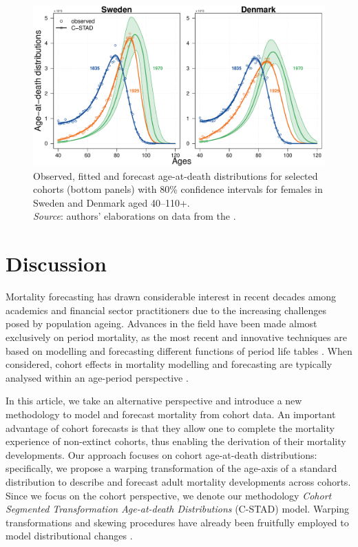\documentclass[11pt, a4paper]{article}
\begin{document}
\begin{figure}[h!]
	\begin{center}
		\includegraphics[scale=0.57]{./Figures/F8.pdf}  
		\caption{Observed, fitted and forecast age-at-death distributions for selected cohorts (bottom panels) with 80\% confidence intervals for females in Sweden and Denmark aged 40--110+.\\ \small \textit{Source}: authors' elaborations on data from the \cite{HMD}.\label{Fig:CSTADforeDx}}    
	\end{center}
\end{figure}

\section{Discussion} 
\label{Sec:Discussion}
Mortality forecasting has drawn considerable interest in recent decades among academics and financial sector practitioners due to the increasing challenges posed by population ageing. Advances in the field have been made almost exclusively on period mortality, as the most recent and innovative techniques are based on modelling and forecasting different functions of period life tables \cite[see, for example,][]{lee1992modeling,cairns2006two,raftery2013bayesian}. When considered, cohort effects in mortality modelling and forecasting are typically analysed within an age-period perspective \citep{renshaw2006cohort,cairns2009quantitative,plat2009stochastic,dokumentov2018bivariate}.  
 
In this article, we take an alternative perspective and introduce a new methodology to model and forecast mortality from cohort data. An important advantage of cohort forecasts is that they allow one to complete the mortality experience of non-extinct cohorts, thus enabling the derivation of their mortality developments. Our approach focuses on cohort age-at-death distributions: specifically, we propose a warping transformation of the age-axis of a standard distribution to describe and forecast adult mortality developments across cohorts. Since we focus on the cohort perspective, we denote our methodology \emph{Cohort Segmented Transformation Age-at-death Distributions} (C-STAD) model. Warping transformations and skewing procedures have already been fruitfully employed to model distributional changes \cite[see, e.g.,][]{fernandez1998bayesian,camarda2008warped}. 
\end{document}
